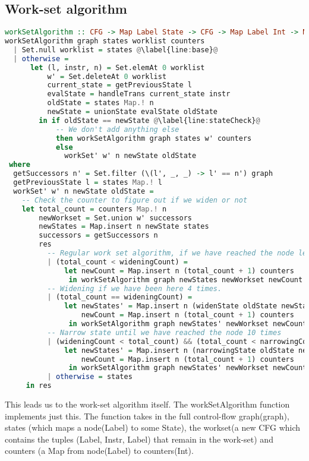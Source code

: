 \subsection{Work-set algorithm}\label{sec:workset}
\begin{lstlisting}[language={haskell}, caption={Workset algorithm}, label={lst:workset}, escapechar=@]
workSetAlgorithm :: CFG -> Map Label State -> CFG -> Map Label Int -> Map Label State
workSetAlgorithm graph states worklist counters
  | Set.null worklist = states @\label{line:base}@
  | otherwise =
      let (l, instr, n) = Set.elemAt 0 worklist
          w' = Set.deleteAt 0 worklist
          current_state = getPreviousState l
          evalState = handleTrans current_state instr
          oldState = states Map.! n
          newState = unionState evalState oldState
        in if oldState == newState @\label{line:stateCheck}@
            -- We don't add anything else
            then workSetAlgorithm graph states w' counters
            else
              workSet' w' n newState oldState
 where
  getSuccessors n' = Set.filter (\(l', _, _) -> l' == n') graph
  getPreviousState l = states Map.! l
  workSet' w' n newState oldState =
    -- Check the counter to figure out if we widen or not
    let total_count = counters Map.! n
        newWorkset = Set.union w' successors
        newStates = Map.insert n newState states
        successors = getSuccessors n
        res
          -- Regular work set algorithm, if we have reached the node less than 4 times
          | (total_count < wideningCount) =
              let newCount = Map.insert n (total_count + 1) counters
               in workSetAlgorithm graph newStates newWorkset newCount
          -- Widening if we have been here 4 times.
          | (total_count == wideningCount) =
              let newStates' = Map.insert n (widenState oldState newState) states
                  newCount = Map.insert n (total_count + 1) counters
               in workSetAlgorithm graph newStates' newWorkset newCount
          -- Narrow state until we have reached the node 10 times
          | (wideningCount < total_count) && (total_count < narrowingCount) =
              let newStates' = Map.insert n (narrowingState oldState newState) states
                  newCount = Map.insert n (total_count + 1) counters
               in workSetAlgorithm graph newStates' newWorkset newCount
          | otherwise = states
     in res
\end{lstlisting}
This leads us to the work-set algorithm itself. The workSetAlgorithm function
implements just this. The function takes in the full control-flow graph(graph),
states (which maps a node(Label) to some State), the workset(a new CFG which
contains the tuples (Label, Instr, Label) that remain in the work-set) and
counters (a Map from node(Label) to counters(Int). 

